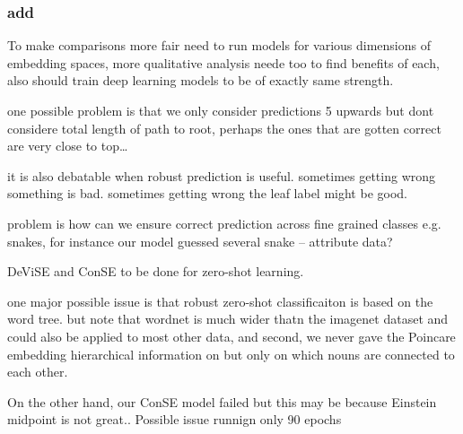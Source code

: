\documentclass[12pt]{report}
\begin{document}
\subsubsection{add}
To make comparisons more fair need to run models for various dimensions of embedding spaces, more qualitative analysis neede too to find benefits of each, also should train deep learning models to be of exactly same strength.

one possible problem is that we only consider predictions 5 upwards but dont considere total length of path to root, perhaps the ones that are gotten correct are very close to top\dots

it is also debatable when robust prediction is useful. sometimes getting wrong something is bad. sometimes getting wrong the leaf label might be good.

problem is how can we ensure correct prediction across fine grained classes e.g. snakes, for instance our model guessed several snake -- attribute data? 

DeViSE and ConSE to be done for zero-shot learning.

one major possible issue is that robust zero-shot classificaiton is based on the word tree. but note that wordnet is much wider thatn the imagenet dataset and could also be applied to most other data, and second, we never gave the Poincare embedding hierarchical information on but only on which nouns are connected to each other.

On the other hand, our ConSE model failed but this may be because Einstein midpoint is not great..  
Possible issue runnign only 90 epochs



\end{document}
